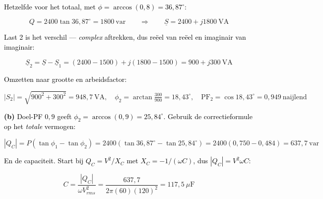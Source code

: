 \documentclass[a4paper,11pt]{article}
\newcommand{\stapreden}[1]{\par\vspace{1.4mm}\noindent\textcolor{black}{#1}\par\vspace{-2mm}}
\begin{document}
\begin{oefening}
    \stapreden{Hetzelfde voor het totaal, met $\phi = \arccos(0{,}8) = 36{,}87^\circ$:}
    \[Q = 2400\tan 36{,}87^\circ = 1800\ \text{var}
        \qquad\Longrightarrow\qquad \underline{S} = 2400 + j1800\ \text{VA}\]

    \stapreden{Last 2 is het verschil --- \emph{complex} aftrekken, dus reëel van reëel en imaginair van imaginair:}
    \[\underline{S}_2 = \underline{S} - \underline{S}_1 = (2400-1500) + j(1800-1500)
        = \boxed{900 + j300\ \text{VA}}\]

    \stapreden{Omzetten naar grootte en arbeidsfactor:}
    \[|S_2| = \sqrt{900^2+300^2} = 948{,}7\ \text{VA}, \quad
        \phi_2 = \arctan\tfrac{300}{900} = 18{,}43^\circ, \quad
        \text{PF}_2 = \cos 18{,}43^\circ = \boxed{0{,}949\ \text{naijlend}}\]

    \stapreden{\textbf{(b)} Doel-PF $0{,}9$ geeft $\phi_2 = \arccos(0{,}9) = 25{,}84^\circ$. Gebruik de correctieformule op het \emph{totale} vermogen:}
    \[|Q_C| = P(\tan\phi_1 - \tan\phi_2) = 2400(\tan 36{,}87^\circ - \tan 25{,}84^\circ)
        = 2400(0{,}750 - 0{,}484) = 637{,}7\ \text{var}\]

    \stapreden{En de capaciteit. Start bij $Q_C = V^2/X_C$ met $X_C = -1/(\omega C)$, dus $|Q_C| = V^2\omega C$:}
    \[C = \frac{|Q_C|}{\omega V_{rms}^2} = \frac{637{,}7}{2\pi(60)(120)^2}
        = \boxed{117{,}5\ \mu\text{F}}\]
\end{oefening}
\end{document}
